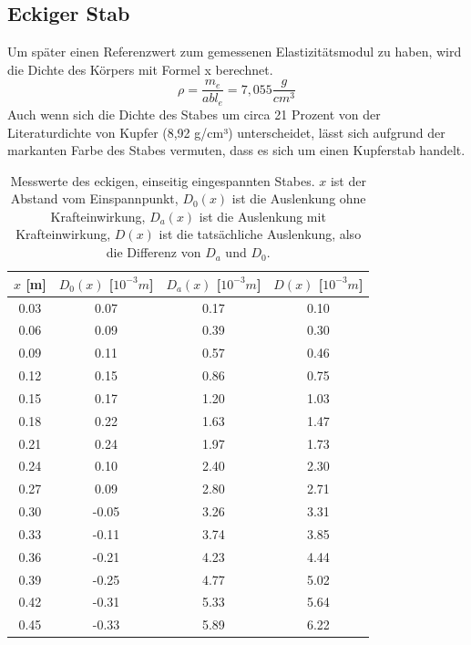 \documentclass[titlepage = firstcover]{scrartcl}
\begin{document}
      \subsection{Eckiger Stab}
        Um später einen Referenzwert zum gemessenen Elastizitätsmodul zu haben, wird die Dichte des Körpers mit Formel x berechnet.
        \begin{equation}
          \rho = \frac{m_e}{a b l_e} = 7,055 \frac{g}{cm^3}
          \label{eqn:DichteEck}
        \end{equation}
        Auch wenn sich die Dichte des Stabes um circa 21 Prozent von der Literaturdichte von Kupfer (8,92 g/cm³) unterscheidet, lässt sich aufgrund der
        markanten Farbe des Stabes vermuten, dass es sich um einen Kupferstab handelt.    
        \begin{table}[h]
          \centering
          \caption{Messwerte des eckigen, einseitig eingespannten Stabes.
                   $x$ ist der Abstand vom Einspannpunkt,
                   $D_0(x)$ ist die Auslenkung ohne Krafteinwirkung,
                   $D_a(x)$ ist die Auslenkung mit Krafteinwirkung,
                   $D(x)$ ist die tatsächliche Auslenkung, also die Differenz von $D_a$ und $D_0$.}
          \label{tab:tabEeins}
          \begin{tabular}{c c c c}
            \toprule
            {$x$ [m]} & {$D_0(x)$ [$10^{-3}m$]} & {$D_a(x)$ [$10^{-3}m$]} & {$D(x)$ [$10^{-3}m$]}\\
            \midrule
            0.03 & 0.07 & 0.17 & 0.10\\
            0.06 & 0.09 & 0.39 & 0.30\\
            0.09 & 0.11 & 0.57 & 0.46\\
            0.12 & 0.15 & 0.86 & 0.75\\
            0.15 & 0.17 & 1.20 & 1.03\\
            0.18 & 0.22 & 1.63 & 1.47\\
            0.21 & 0.24 & 1.97 & 1.73\\
            0.24 & 0.10 & 2.40 & 2.30\\
            0.27 & 0.09 & 2.80 & 2.71\\
            0.30 &-0.05 & 3.26 & 3.31\\
            0.33 &-0.11 & 3.74 & 3.85\\
            0.36 &-0.21 & 4.23 & 4.44\\
            0.39 &-0.25 & 4.77 & 5.02\\
            0.42 &-0.31 & 5.33 & 5.64\\
            0.45 &-0.33 & 5.89 & 6.22\\
            \bottomrule            
          \end{tabular}
        \end{table}
\end{document}
